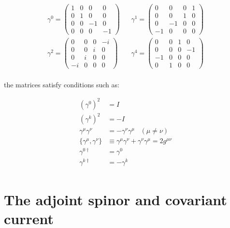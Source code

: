 \documentclass[10pt]{article}
\theoremstyle{definition}
\begin{document}
\begin{align*}
    \gamma^0 = \begin{pmatrix}
        1 & 0 & 0 & 0\\
        0 & 1 & 0 & 0\\
        0 & 0 & -1 & 0\\
        0 & 0 & 0 & -1
    \end{pmatrix}
    \;\;\;&
    \gamma^1 = \begin{pmatrix}
        0 & 0 & 0 & 1\\
        0 & 0 & 1 & 0\\
        0 & -1 & 0 & 0\\
        -1 & 0 & 0 & 0
    \end{pmatrix}\\
    \gamma^2 = \begin{pmatrix}
        0 & 0 & 0 & -i\\
        0 & 0 & i & 0\\
        0 & i & 0 & 0\\
        -i & 0 & 0 & 0
    \end{pmatrix}
    \;\;\;&
    \gamma^4 = \begin{pmatrix}
        0 & 0 & 1 & 0\\
        0 & 0 & 0 & -1\\
        -1 & 0 & 0 & 0\\
        0 & 1 & 0 & 0
    \end{pmatrix}\\
\end{align*}

the matrices satisfy conditions such as:

\begin{align*}
    (\gamma^0)^2 &= I\\
    (\gamma^k)^2 &= -I\\
    \gamma^{\mu}\gamma^{\nu} &= -\gamma^{\nu}\gamma^{\mu}\;\;\; (\mu\neq\nu)\\
    \{\gamma^{\mu},\gamma^{\nu}\} &\equiv  \gamma^{\mu}\gamma^{\nu} +  \gamma^{\nu}\gamma^{\mu} = 2g^{\mu\nu}\\
    \gamma^{0\dagger} &= \gamma^0\\
    \gamma^{k\dagger} &= -\gamma^k\\
\end{align*}

\section*{The adjoint spinor and covariant current}%
\end{document}
